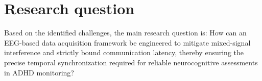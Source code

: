 \newpage
\section{Research question}\label{sec:question}

Based on the identified challenges, the main research question is: How can an EEG-based data acquisition framework be engineered to mitigate mixed-signal interference and strictly bound communication latency, thereby ensuring the precise temporal synchronization required for reliable neurocognitive assessments in ADHD monitoring?


